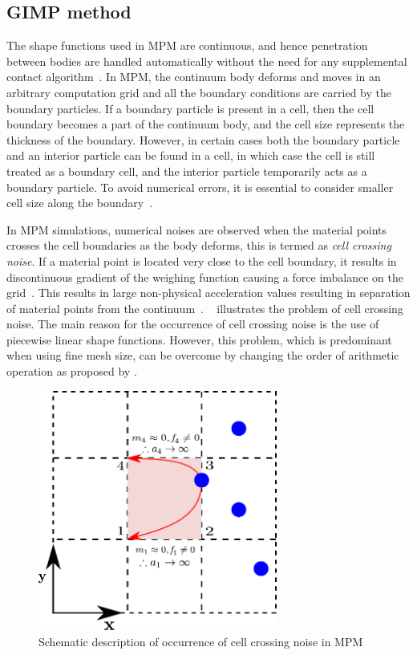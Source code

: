 \subsection{GIMP method}

The shape functions used in MPM are continuous, and hence penetration between 
bodies are handled automatically without the need for any supplemental contact 
algorithm~\citep{Chen2002}. In MPM, the continuum body deforms and moves in 
an arbitrary computation grid and all the boundary conditions are carried by 
the boundary particles. If a boundary particle is present in a cell, then the 
cell boundary becomes a part of the continuum body, and the cell size 
represents the thickness of the boundary. However, in certain cases both the 
boundary particle and an interior particle can be found in a cell, in which 
case the cell is still treated as a boundary cell, and the interior particle 
temporarily acts as a boundary particle. To avoid numerical errors, it is 
essential to consider smaller cell size along the boundary~\citep{Chen2002}. 

In MPM simulations, numerical noises are observed when the material points 
crosses the cell boundaries as the body deforms, this is termed 
as \textit{cell crossing noise}. If a material point is located very close to 
the cell boundary, it results in discontinuous gradient of the weighing 
function causing a force imbalance on the grid~\citep{Bardenhagen2004}. This 
results in large non-physical acceleration values resulting in separation of 
material points from the continuum~\citep{Sulsky1995}. 
~ illustrates the problem of cell crossing noise. The 
main reason for the occurrence of cell crossing noise is the use of piecewise 
linear shape functions. However, this problem, which is predominant when using 
fine mesh size, can be overcome by changing the order of arithmetic operation 
as proposed by \citet{Sulsky1995}. 

\begin{figure}[htbp]
\centering
\includegraphics[width=0.7\textwidth]{cellnoise}
\caption{Schematic description of occurrence of cell crossing noise in MPM}
\label{fig:cellnoise}
\end{figure}

